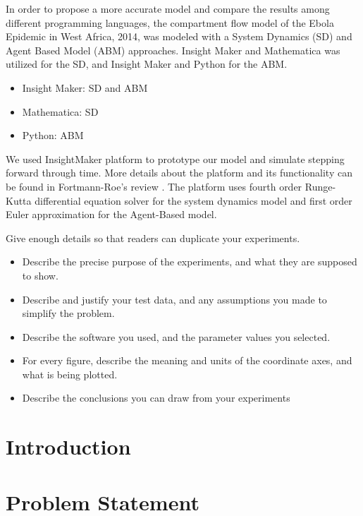 \documentclass[10pt]{article}
\begin{document}
In order to propose a more accurate model and compare the results among different programming  languages, the compartment flow model of the Ebola Epidemic in West Africa, 2014, was modeled with a System Dynamics (SD) and Agent Based Model (ABM) approaches.  Insight Maker and Mathematica was utilized  for the SD, and Insight Maker and Python for the ABM.

\begin{itemize}
\item Insight Maker: SD and ABM
\item Mathematica: SD
\item Python: ABM
\end{itemize}
We used InsightMaker platform to prototype our model and simulate stepping forward through time. More details about the platform and its functionality can be found in Fortmann-Roe's review \cite{FortmannRoe}. The platform uses fourth order Runge-Kutta differential equation solver for the system dynamics model and  first order Euler approximation for the Agent-Based model.

Give enough details so that readers can duplicate your experiments.

\begin{itemize}
\item Describe the precise purpose of the experiments, and what they 
are supposed to show.

\item Describe and justify your test data, and any assumptions you made to 
simplify the problem.

\item Describe the software you used, and the 
parameter values you selected.

\item 
For every figure, describe the meaning and units of the coordinate axes, 
and what is being plotted.

\item Describe the conclusions you can draw from your experiments
\end{itemize}

\section{Introduction}



\section{Problem Statement}

\end{document}
